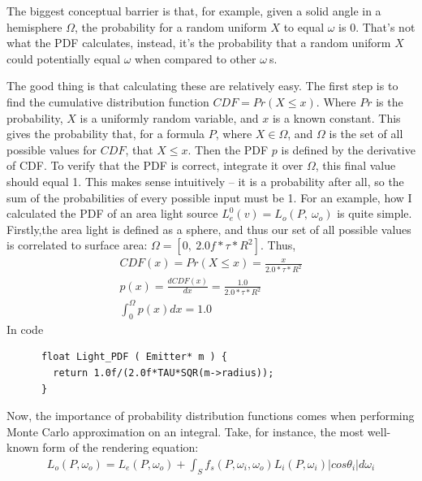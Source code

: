 \message{ !name(test.tex)}\documentclass{article}
\begin{document}
    The biggest conceptual barrier is that, for example, given a solid angle in
a hemisphere $\Omega$, the probability for a random uniform $X$ to equal
$\omega$ is 0. That's not what the PDF calculates, instead, it's the probability
that a random uniform $X$ could potentially equal $\omega$ when compared to
other $\omega\:$s.
    

    The good thing is that calculating these are relatively easy. The first step
is to find the cumulative distribution function $CDF = Pr(X \leq x)$. Where $Pr$
is the probability, $X$ is a uniformly random variable, and $x$ is a known
constant. This gives the probability that, for a formula $P$, where $X \in
\Omega$, and $\Omega$ is the set of all possible values for $CDF$, that $X \leq
x$. Then the PDF $p$ is defined by the derivative of CDF. To verify that the PDF
is correct, integrate it over $\Omega$, this final value should equal 1. This
makes sense intuitively -- it is a probability after all, so the sum of the
probabilities of every possible input must be 1. For an example, how I
calculated the PDF of an area light source
      $L^0_e(v) = L_o(P,\:\omega_o)$ 
    is quite simple. Firstly,the area light is defined as a sphere, and thus our
set of all possible values is correlated to surface area:
    $\Omega = [0,\:2.0f*\tau*R^2]$. Thus,
    \begin{align}
      CDF(x) = Pr(X \leq x) = \frac{x}{2.0*\tau*R^2}\\
      p(x) = \frac{dCDF(x)}{dx} = \frac{1.0}{2.0*\tau*R^2}\\
      \int_0^{\Omega}p(x)dx = 1.0
    \end{align}
    In code
    \begin{lstlisting}
      float Light_PDF ( Emitter* m ) {
        return 1.0f/(2.0f*TAU*SQR(m->radius));
      }
    \end{lstlisting}
    
    
  
  Now, the importance of probability distribution functions comes when
performing Monte Carlo approximation on an integral. Take, for instance, the
most well-known form of the rendering equation:
  \begin{align}
    L_o(P, \omega_o) = L_e(P, \omega_o) + \int_{S}f_s(P, \omega_i,
    \omega_o) L_i(P, \omega_i) \vert cos\theta_i\vert d\omega_i
  \end{align}
  
\end{document}
